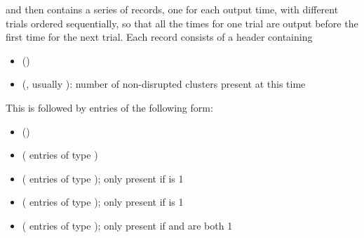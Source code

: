 \documentclass[letterpaper,10pt,english]{sphinxmanual}
\begin{document}
and then contains a series of records, one for each output time, with different trials ordered sequentially, so that all the times for one trial are output before the first time for the next trial. Each record consists of a header containing
\begin{itemize}
\item {} 
 ()

\item {} 
 (, usually ): number of non-disrupted clusters present at this time

\end{itemize}

This is followed by  entries of the following form:
\begin{itemize}
\item {} 
 ()

\item {} 
 ( entries of type )

\item {} 
 ( entries of type ); only present if  is 1

\item {} 
 ( entries of type ); only present if  is 1

\item {} 
 ( entries of type ); only present if  and  are both 1

\end{itemize}
\end{document}
